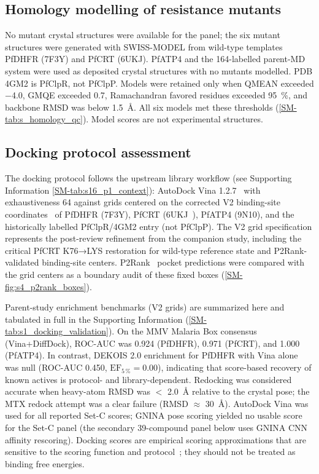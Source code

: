 \documentclass[11pt,a4paper]{article}
\begin{document}
\subsection{Homology modelling of resistance mutants}

No mutant crystal structures were available for the panel; the six mutant structures were generated with SWISS-MODEL from wild-type templates PfDHFR (7F3Y) and PfCRT (6UKJ). PfATP4 and the 164-labelled parent-MD system were used as deposited crystal structures with no mutants modelled. PDB 4GM2 is PfClpR, not PfClpP. Models were retained only when QMEAN exceeded \num{-4.0}, GMQE exceeded \num{0.7}, Ramachandran favored residues exceeded \qty{95}{\percent}, and backbone RMSD was below \qty{1.5}{\angstrom}. All six models met these thresholds (\cref{SM-tab:s_homology_qc}). Model scores are not experimental structures.

\subsection{Docking protocol assessment}

The docking protocol follows the upstream library workflow (see Supporting Information \cref{SM-tab:s16_p1_context}): AutoDock Vina 1.2.7~\citep{vina_2021} with exhaustiveness \num{64} against grids centered on the corrected V2 binding-site coordinates~\citep{Temgoua2026} of PfDHFR (7F3Y), PfCRT (6UKJ~\citep{Kim2019PfCRT}), PfATP4 (9N10), and the historically labelled PfClpR/4GM2 entry (not PfClpP). The V2 grid specification represents the post-review refinement from the companion study, including the critical PfCRT K76→LYS restoration for wild-type reference state and P2Rank-validated binding-site centers. P2Rank~\citep{Krivak2018P2Rank} pocket predictions were compared with the grid centers as a boundary audit of these fixed boxes (\cref{SM-fig:s4_p2rank_boxes}).

Parent-study enrichment benchmarks (V2 grids) are summarized here and tabulated in full in the Supporting Information (\cref{SM-tab:s1_docking_validation}). On the MMV Malaria Box consensus (Vina+DiffDock), ROC-AUC was \num{0.924} (PfDHFR), \num{0.971} (PfCRT), and \num{1.000} (PfATP4). In contrast, DEKOIS 2.0 enrichment for PfDHFR with Vina alone was null (ROC-AUC \num{0.450}, $\mathrm{EF}_{5\,\%} = \num{0.00}$), indicating that score-based recovery of known actives is protocol- and library-dependent. Redocking was considered accurate when heavy-atom RMSD was $<$ \qty{2.0}{\angstrom} relative to the crystal pose; the MTX redock attempt was a clear failure (RMSD $\approx$ \qty{30}{\angstrom}). AutoDock Vina was used for all reported Set-C scores; GNINA pose scoring yielded no usable score for the Set-C panel (the secondary 39-compound panel below uses GNINA CNN affinity rescoring). Docking scores are empirical scoring approximations that are sensitive to the scoring function and protocol~\citep{ferreira2023docking,sadybekov2023computational,kittelson2026docking}; they should not be treated as binding free energies.
\end{document}
